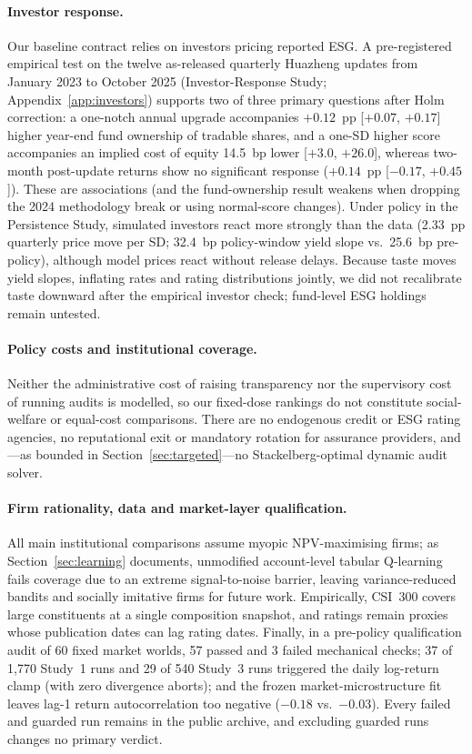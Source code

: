 \documentclass[11pt]{article}
\begin{document}
\paragraph{Investor response.}
Our baseline contract relies on investors pricing reported ESG. A pre-registered empirical test on the twelve as-released quarterly Huazheng updates from January 2023 to October 2025 (Investor-Response Study; Appendix~\ref{app:investors}) supports two of three primary questions after Holm correction: a one-notch annual upgrade accompanies $+0.12$~pp [$+0.07$, $+0.17$] higher year-end fund ownership of tradable shares, and a one-SD higher score accompanies an implied cost of equity 14.5~bp lower [$+3.0$, $+26.0$], whereas two-month post-update returns show no significant response ($+0.14$~pp [$-0.17$, $+0.45$]). These are associations (and the fund-ownership result weakens when dropping the 2024 methodology break or using normal-score changes). Under policy in the Persistence Study, simulated investors react more strongly than the data (2.33~pp quarterly price move per SD; 32.4~bp policy-window yield slope vs.\ 25.6~bp pre-policy), although model prices react without release delays. Because taste moves yield slopes, inflating rates and rating distributions jointly, we did not recalibrate taste downward after the empirical investor check; fund-level ESG holdings remain untested.

\paragraph{Policy costs and institutional coverage.}
Neither the administrative cost of raising transparency nor the supervisory cost of running audits is modelled, so our fixed-dose rankings do not constitute social-welfare or equal-cost comparisons. There are no endogenous credit or ESG rating agencies, no reputational exit or mandatory rotation for assurance providers, and---as bounded in Section~\ref{sec:targeted}---no Stackelberg-optimal dynamic audit solver.

\paragraph{Firm rationality, data and market-layer qualification.}
All main institutional comparisons assume myopic NPV-maximising firms; as Section~\ref{sec:learning} documents, unmodified account-level tabular Q-learning fails coverage due to an extreme signal-to-noise barrier, leaving variance-reduced bandits and socially imitative firms for future work. Empirically, CSI~300 covers large constituents at a single composition snapshot, and ratings remain proxies whose publication dates can lag rating dates. Finally, in a pre-policy qualification audit of 60 fixed market worlds, 57 passed and 3 failed mechanical checks; 37 of 1,770 Study~1 runs and 29 of 540 Study~3 runs triggered the daily log-return clamp (with zero divergence aborts); and the frozen market-microstructure fit leaves lag-1 return autocorrelation too negative ($-0.18$ vs.\ $-0.03$). Every failed and guarded run remains in the public archive, and excluding guarded runs changes no primary verdict.
\end{document}

